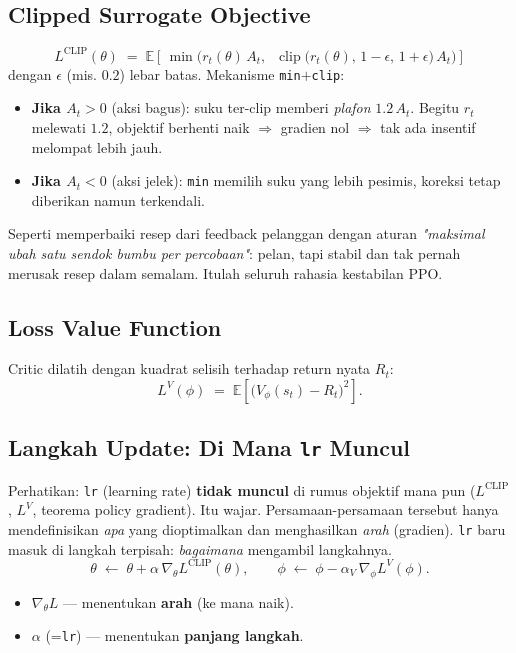 \documentclass[11pt,a4paper]{article}
\newcommand{\E}{\mathbb{E}}
\newcommand{\clip}{\operatorname{clip}}
\begin{document}
\subsection{Clipped Surrogate Objective}
\[ \boxed{\; L^{\mathrm{CLIP}}(\theta) \;=\; \E\!\left[\, \min\!\Big( r_t(\theta)\,A_t,\;\; \clip\big(r_t(\theta),\,1-\epsilon,\,1+\epsilon\big)\,A_t \Big) \right] \;} \]
dengan $\epsilon$ (mis. $0.2$) lebar batas. Mekanisme \texttt{min}$+$\texttt{clip}:
\begin{itemize}[nosep]
  \item \textbf{Jika $A_t > 0$} (aksi bagus): suku ter-clip memberi \emph{plafon} $1.2\,A_t$. Begitu $r_t$ melewati $1.2$, objektif berhenti naik $\Rightarrow$ gradien nol $\Rightarrow$ tak ada insentif melompat lebih jauh.
  \item \textbf{Jika $A_t < 0$} (aksi jelek): \texttt{min} memilih suku yang lebih pesimis, koreksi tetap diberikan namun terkendali.
\end{itemize}

\begin{intuisi}
Seperti memperbaiki resep dari feedback pelanggan dengan aturan
\emph{"maksimal ubah satu sendok bumbu per percobaan"}: pelan, tapi stabil dan tak
pernah merusak resep dalam semalam. Itulah seluruh rahasia kestabilan PPO.
\end{intuisi}

\subsection{Loss Value Function}
Critic dilatih dengan kuadrat selisih terhadap return nyata $R_t$:
\[ L^{V}(\phi) \;=\; \E\!\left[\big( V_\phi(s_t) - R_t \big)^2\right]. \]

\subsection{Langkah Update: Di Mana \texttt{lr} Muncul}
Perhatikan: \texttt{lr} (learning rate) \textbf{tidak muncul} di rumus objektif mana pun
($L^{\mathrm{CLIP}}$, $L^V$, teorema policy gradient). Itu wajar. Persamaan-persamaan
tersebut hanya mendefinisikan \emph{apa} yang dioptimalkan dan menghasilkan \emph{arah}
(gradien). \texttt{lr} baru masuk di langkah terpisah: \emph{bagaimana} mengambil langkahnya.
\[ \theta \;\leftarrow\; \theta + \alpha\,\nabla_\theta L^{\mathrm{CLIP}}(\theta), \qquad \phi \;\leftarrow\; \phi - \alpha_V\,\nabla_\phi L^{V}(\phi). \]
\begin{itemize}[nosep]
  \item $\nabla_\theta L$ --- menentukan \textbf{arah} (ke mana naik).
  \item $\alpha$ (=\texttt{lr}) --- menentukan \textbf{panjang langkah}.
\end{itemize}
\end{document}
